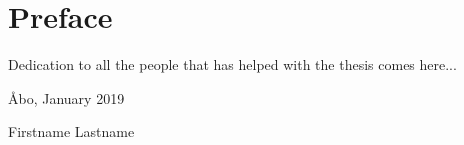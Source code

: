 \chapter*{Preface}
%

Dedication to all the people that has helped with the thesis comes here...

\Blindtext[2]

\vspace{2cm}
{\AA}bo, January 2019

\vspace{1cm}
Firstname Lastname